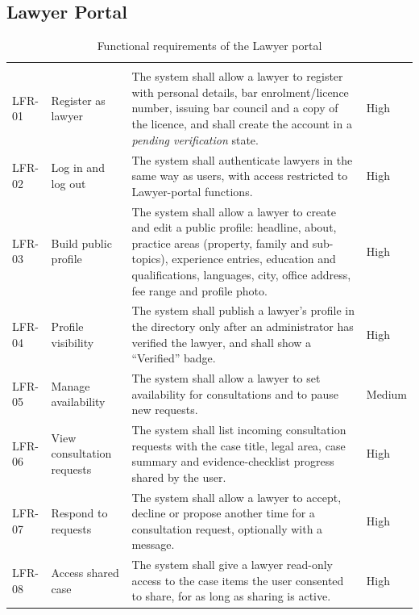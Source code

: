 \subsection{Lawyer Portal}

\begin{longtable}{|L{1.66cm}|L{2.35cm}|L{8.30cm}|L{1.70cm}|}
\caption{Functional requirements of the Lawyer portal}\label{tab:3.2}\\
\hline\headrow {} &  &  &  \\ \hline
\endfirsthead
\hline\headrow {} &  &  &  \\ \hline
\endhead
\hline\endlastfoot
LFR-01 & Register as lawyer & The system shall allow a lawyer to register with personal details, bar enrolment/licence number, issuing bar council and a copy of the licence, and shall create the account in a \emph{pending verification} state. & High \\ \hline
LFR-02 & Log in and log out & The system shall authenticate lawyers in the same way as users, with access restricted to Lawyer-portal functions. & High \\ \hline
LFR-03 & Build public profile & The system shall allow a lawyer to create and edit a public profile: headline, about, practice areas (property, family and sub-topics), experience entries, education and qualifications, languages, city, office address, fee range and profile photo. & High \\ \hline
LFR-04 & Profile visibility & The system shall publish a lawyer's profile in the directory only after an administrator has verified the lawyer, and shall show a ``Verified'' badge. & High \\ \hline
LFR-05 & Manage availability & The system shall allow a lawyer to set availability for consultations and to pause new requests. & Medium \\ \hline
LFR-06 & View consultation requests & The system shall list incoming consultation requests with the case title, legal area, case summary and evidence-checklist progress shared by the user. & High \\ \hline
LFR-07 & Respond to requests & The system shall allow a lawyer to accept, decline or propose another time for a consultation request, optionally with a message. & High \\ \hline
LFR-08 & Access shared case & The system shall give a lawyer read-only access to the case items the user consented to share, for as long as sharing is active. & High \\ \hline

\end{longtable}
